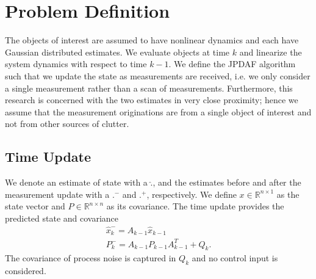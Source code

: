 \documentclass[letterpaper, 10pt, conference]{ieeeconf}
\renewcommand{\Re}{\ensuremath{\mathbb{R}}}
\begin{document}
\section{Problem Definition}
\label{ProbDef}
The objects of interest are assumed to have nonlinear dynamics and each have Gaussian distributed estimates. We evaluate objects at time $k$ and linearize the system dynamics with respect to time $k-1$. We define the JPDAF algorithm such that we update the state as measurements are received, i.e. we only consider a single measurement rather than a scan of measurements. Furthermore, this research is concerned with the two estimates in very close proximity; hence we assume that the measurement originations are from a single object of interest and not from other sources of clutter.

\subsection{Time Update} We denote an estimate of state with a $\hat{.}$, and the estimates before and after the measurement update with a $.^-$ and $.^+$, respectively. We define $x\in \Re^{n\times1}$ as the state vector and $P\in\Re^{n\times n}$ as its covariance. The time update provides the predicted state and covariance
\begin{gather}
\hat{x}_{k}^{-}=A_{k-1}\hat{x}_{k-1} \\
P_{k}^{-}=A_{k-1}P_{k-1}A_{k-1}^T+Q_k.
\end{gather}
The covariance of process noise is captured in $Q_k$ and no control input is considered.
\end{document}
